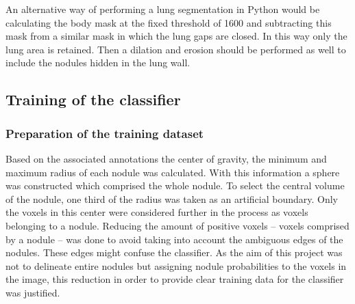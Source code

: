 An alternative way of performing a lung segmentation in Python would be
calculating the body mask at the fixed threshold of 1600 and subtracting this
mask from a similar mask in which the lung gaps are closed. In this way only the
lung area is retained. Then a dilation and erosion should be performed as well
to include the nodules hidden in the lung wall.

\subsection{Training of the classifier}
\subsubsection{Preparation of the training dataset}
Based on the associated annotations the center of gravity, the minimum and
maximum radius of each nodule was calculated. With this information a sphere
was constructed which comprised the whole nodule. To select the central volume
of the nodule, one third of the radius was taken as an artificial boundary. Only
the voxels in this center were considered further in the process as voxels
belonging to a nodule. Reducing the amount of positive voxels -- voxels
comprised by a nodule -- was done to avoid taking into account the ambiguous
edges of the nodules. These edges might confuse the classifier. As the aim of
this project was not to delineate entire nodules but assigning nodule
probabilities to the voxels in the image, this reduction in order to provide
clear training data for the classifier was justified.

